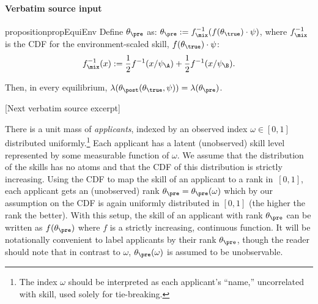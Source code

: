 \documentclass[10pt]{article}
\begin{document}
\paragraph{Verbatim source input}
\begin{ReviewVerbatim}
\begin{restatable}{proposition}{propEquiEnv}\label{prop:equi-env}
Define $\theta_\pre$ as:
	\(\theta_\pre := f^{-1}_\mix(f(\theta_\true)\cdot \psi)\),
		where $f^{-1}_\mix$	is the CDF for the environment-scaled skill, $f(\theta_\true)\cdot \psi$:
	\begin{equation*}
	f^{-1}_\mix(x) := \frac{1}{2}f^{-1}(x/\psi_\A)+ \frac{1}{2}f^{-1}(x/\psi_\B).
	\end{equation*}

	Then, in every equilibrium, $\lambda(\theta_{\post}(\theta_\true, \psi))=\lambda(\theta_\pre)$.%
\end{restatable}

[Next verbatim source excerpt]

There is a unit mass of \textit{applicants}, indexed by an observed index $\omega \in [0,1]$ distributed uniformly.\footnote{The index $\omega$ should be interpreted as each applicant's ``name,'' uncorrelated with skill, used solely for tie-breaking.}  Each applicant has a latent (unobserved) skill level represented by some measurable function of $\omega$.
We assume that {the distribution of the skills} has no atoms and that the CDF of this distribution is strictly increasing.
Using the CDF to map the skill of an applicant to a rank in~$[0,1]$, each applicant gets an (unobserved) rank $\theta_\pre =\theta_\pre(\omega)$ which by our assumption on the CDF is again uniformly distributed in $[0, 1]$ (the higher the rank the better).  With this setup, the skill of an applicant with rank $\theta_\pre$ can be written as $f(\theta_\pre)$ where $f$ is a strictly increasing, continuous function.  {It will be notationally convenient to label applicants by their rank $\theta_\pre$, though the reader should note that in contrast to $\omega$, $\theta_\pre(\omega)$ is assumed to be unobservable.}




\end{ReviewVerbatim}
\end{document}

